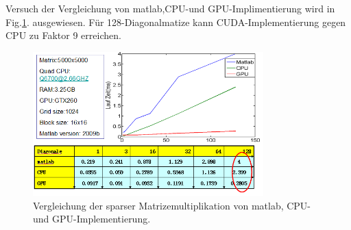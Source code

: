 

Versuch der Vergleichung von matlab,CPU-und GPU-Implimentierung wird in Fig.\ref{compareSparse}. ausgewiesen. Für 128-Diagonalmatize kann CUDA-Implementierung gegen CPU zu Faktor 9 erreichen.


\begin{figure}[htbp]
\includegraphics[width=3.5in]{.//pic//compareSparse}
\caption{Vergleichung der sparser Matrizemultiplikation von matlab, CPU-und GPU-Implementierung.}
\label{compareSparse} 
\end{figure}